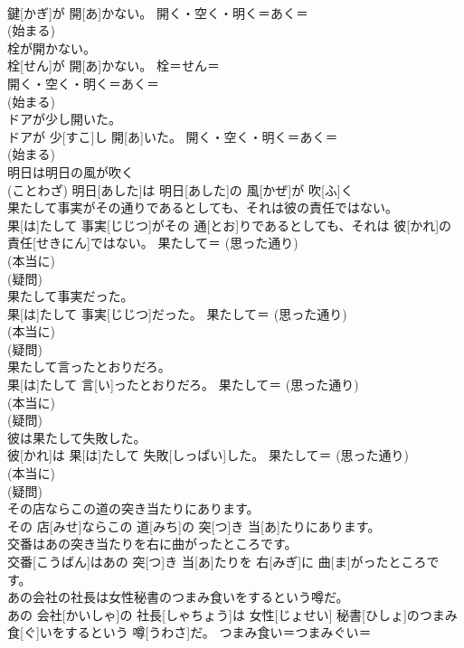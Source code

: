 \documentclass[8pt]{extreport}
\begin{document}
\begin{CJK}{UTF8}{min}
{\\	鍵[かぎ]が 開[あ]かない。	開く・空く・明く＝あく＝ 
\\	(始まる) 
\\	栓が開かない。	
\\	栓[せん]が 開[あ]かない。	栓＝せん＝ 
\\	開く・空く・明く＝あく＝ 
\\	(始まる) 
\\	ドアが少し開いた。	
\\	ドアが 少[すこ]し 開[あ]いた。	開く・空く・明く＝あく＝ 
\\	(始まる) 
\\	明日は明日の風が吹く	
\\	(ことわざ)	明日[あした]は 明日[あした]の 風[かぜ]が 吹[ふ]く	
\\	果たして事実がその通りであるとしても、それは彼の責任ではない。	
\\	果[は]たして 事実[じじつ]がその 通[とお]りであるとしても、それは 彼[かれ]の 責任[せきにん]ではない。	果たして＝ (思った通り) 
\\	(本当に) 
\\	(疑問) 
\\	果たして事実だった。	
\\	果[は]たして 事実[じじつ]だった。	果たして＝ (思った通り) 
\\	(本当に) 
\\	(疑問) 
\\	果たして言ったとおりだろ。	
\\	果[は]たして 言[い]ったとおりだろ。	果たして＝ (思った通り) 
\\	(本当に) 
\\	(疑問) 
\\	彼は果たして失敗した。	
\\	彼[かれ]は 果[は]たして 失敗[しっぱい]した。	果たして＝ (思った通り) 
\\	(本当に) 
\\	(疑問) 
\\	その店ならこの道の突き当たりにあります。	
\\	その 店[みせ]ならこの 道[みち]の 突[つ]き 当[あ]たりにあります。	
\\	交番はあの突き当たりを右に曲がったところです。	
\\	交番[こうばん]はあの 突[つ]き 当[あ]たりを 右[みぎ]に 曲[ま]がったところです。	
\\	あの会社の社長は女性秘書のつまみ食いをするという噂だ。	
\\	あの 会社[かいしゃ]の 社長[しゃちょう]は 女性[じょせい] 秘書[ひしょ]のつまみ 食[ぐ]いをするという 噂[うわさ]だ。	つまみ食い＝つまみぐい＝ 
}
\end{CJK}
\end{document}
